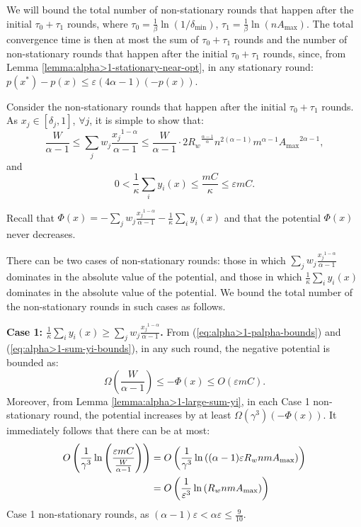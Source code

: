 \documentclass[11pt]{article}
\makeatletter
\newcommand{\wratio}{R_w}
\newenvironment{proofof}[1]{\par
  \pushQED{\qed}\normalfont \topsep3\p@\relax
  \trivlist
  \item[\hskip\labelsep
        \bfseries
    Proof of #1\@addpunct{.}]\ignorespaces
}{\popQED\endtrivlist\@endpefalse
}
\makeatother
\begin{document}
\begin{proofof}{Theorem \ref{thm:convergence-alpha>1}}
We will bound the total number of non-stationary rounds that happen after the initial $\tau_0 + \tau_1$ rounds, where $\tau_0 = \frac{1}{\beta}\ln(1/\delta_{\min})$, $\tau_1 = \frac{1}{\beta}\ln(nA_{\max})$. The total convergence time is then at most the sum of $\tau_0+\tau_1$ rounds and the number of non-stationary rounds that happen after the initial $\tau_0 + \tau_1$ rounds, since, from Lemma \ref{lemma:alpha>1-stationary-near-opt}, in any stationary round: $p(x^*) - p(x)\leq \varepsilon(4\alpha-1)(-p(x))$.

Consider the non-stationary rounds that happen after the initial $\tau_0 + \tau_1$ rounds. 
As $x_j\in[\delta_j, 1]$, $\forall j$, it is simple to show that:
\begin{equation}
\frac{W}{\alpha-1}\leq \sum_j w_j \frac{{x_j}^{1-\alpha}}{\alpha-1}\leq \frac{W}{\alpha-1}\cdot 2{\wratio}^{\frac{\alpha-1}{\alpha}}n^{2(\alpha-1)}m^{\alpha-1}{A_{\max}}^{2\alpha -1}, \label{eq:alpha>1-palpha-bounds}
\end{equation}
and
\begin{equation}
0< \frac{1}{\kappa}\sum_{i} y_i(x)\leq \frac{mC}{\kappa}\leq \varepsilon m C. \label{eq:alpha>1-sum-yi-bounds}
\end{equation}

Recall that $\Phi(x) = - \sum_j w_j \frac{{x_j}^{1-\alpha}}{\alpha-1} - \frac{1}{\kappa}\sum_{i} y_i(x)$ and that the potential $\Phi(x)$ never decreases.

There can be two cases of non-stationary rounds: those in which $\sum_j w_j \frac{{x_j}^{1-\alpha}}{\alpha-1}$ dominates in the absolute value of the potential, and those in which $\frac{1}{\kappa}\sum_{i} y_i(x)$ dominates in the absolute value of the potential. We bound the total number of the non-stationary rounds in such cases as follows.

\noindent\textbf{Case 1: $\frac{1}{\kappa}\sum_{i} y_i(x) \geq \sum_j w_j \frac{{x_j}^{1-\alpha}}{\alpha-1}$.}  
From (\ref{eq:alpha>1-palpha-bounds}) and (\ref{eq:alpha>1-sum-yi-bounds}), in any such round, the negative potential is bounded as:
\begin{equation*}
\Omega\left( \frac{W}{\alpha-1}\right)\leq -\Phi(x)\leq O\left(\varepsilon{mC}\right).
\end{equation*}
Moreover, from Lemma \ref{lemma:alpha>1-large-sum-yi}, in each Case 1 non-stationary round, the potential increases by at least $\Omega(\gamma^3)(-\Phi(x))$. It immediately follows that there can be at most:
\begin{align}
O\left(\frac{1}{\gamma^3}\ln\left(\frac{\varepsilon{mC}}{\frac{W}{\alpha-1}}\right)\right)&= O\left(\frac{1}{\gamma^3}\ln\left((\alpha-1)\varepsilon\wratio nmA_{\max}\right)\right)\notag\\
&= O\left(\frac{1}{\varepsilon^3}\ln\left(\wratio nmA_{\max}\right)\right) \label{eq:alpha>1-conv-bound-1}
\end{align}
Case 1 non-stationary rounds, as $(\alpha-1)\varepsilon<\alpha\varepsilon\leq \frac{9}{10}$.


\end{proofof}
\end{document}
